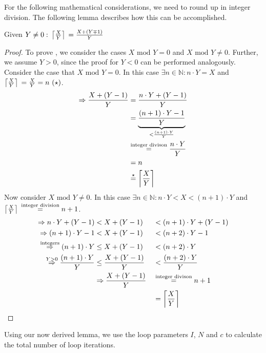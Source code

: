 For the following mathematical considerations, we need to round up in integer division.
The following lemma describes how this can be accomplished.
\begin{lem}\label{lem:impl:fixup:duff:ceil-mp}
    Given $Y \neq 0: \medspace \left\lceil{}\frac{X}{Y}\right\rceil{} = \frac{X + (Y \mp 1)}{Y}$
\end{lem}

\begin{proof}
    To prove , we consider the cases $X \text{ mod } Y = 0$ and $X \text{ mod } Y \neq 0$.
    Further, we assume $Y > 0$, since the proof for $Y < 0$ can be performed analogously.
    Consider the case that $X \text{ mod } Y = 0$.
    In this case $\exists n \in \mathbb{N}: n \cdot Y = X$ and $\left\lceil{}\frac{X}{Y}\right\rceil{} = \frac{X}{Y} = n~(\star)$.
    \begin{align*}
        \Rightarrow \frac{X + (Y - 1)}{Y} &= \frac{n \cdot Y + (Y - 1)}{Y}\\
        &=\underbrace{\frac{(n + 1) \cdot Y - 1}{Y}}_{< \frac{(n + 1) \cdot Y}{Y}}\\
        &\overset{\text{integer divison}}{=} \frac{n \cdot Y}{Y}\\
        &= n\\
        &\overset{\star}{=} \left\lceil{}\frac{X}{Y}\right\rceil{}
    \end{align*}
    Now consider $X \text{ mod } Y \neq 0$.
    In this case $\exists n \in \mathbb{N}: n \cdot Y < X < (n + 1) \cdot Y$ and $\left\lceil{}\frac{X}{Y}\right\rceil{} \overset{\text{integer division}}{=} n + 1$.
    \begin{alignat*}{2}
        \Rightarrow n \cdot Y + (Y - 1) &< X + (Y - 1) &&< (n + 1) \cdot Y + (Y - 1)\\
        \Rightarrow (n + 1) \cdot Y - 1&< X + (Y - 1) &&< (n + 2) \cdot Y - 1\\
        \overset{\text{integers}}{\Rightarrow}  (n + 1) \cdot Y &\leq X + (Y - 1) &&< (n + 2) \cdot Y\\
        \overset{Y > 0}{\Rightarrow} \frac{(n + 1) \cdot Y}{Y} &\leq \frac{X + (Y - 1)}{Y} &&< \frac{(n + 2) \cdot Y}{Y}\\
        &\Rightarrow \frac{X + (Y - 1)}{Y} &&\overset{\text{integer divison}}= n + 1\\
        & &&= \left\lceil{}\frac{X}{Y}\right\rceil{}
    \end{alignat*}
\end{proof}

Using our now derived lemma, we use the loop parameters $I$, $N$ and $c$ to calculate the total number of loop iterations.

